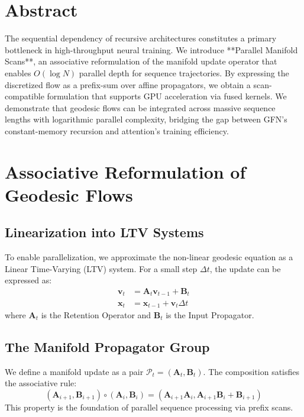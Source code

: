 \documentclass[11pt,a4paper]{report}
\begin{document}
\section{Abstract}
The sequential dependency of recursive architectures constitutes a primary bottleneck in high-throughput neural training. We introduce **Parallel Manifold Scans**, an associative reformulation of the manifold update operator that enables $O(\log N)$ parallel depth for sequence trajectories. By expressing the discretized flow as a prefix-sum over affine propagators, we obtain a scan-compatible formulation that supports GPU acceleration via fused kernels. We demonstrate that geodesic flows can be integrated across massive sequence lengths with logarithmic parallel complexity, bridging the gap between GFN's constant-memory recursion and attention's training efficiency.

\section{Associative Reformulation of Geodesic Flows}

\subsection{Linearization into LTV Systems}
To enable parallelization, we approximate the non-linear geodesic equation as a Linear Time-Varying (LTV) system. For a small step $\Delta t$, the update can be expressed as:
\begin{align}
    \mathbf{v}_t &= \mathbf{A}_t \mathbf{v}_{t-1} + \mathbf{B}_t \\
    \mathbf{x}_t &= \mathbf{x}_{t-1} + \mathbf{v}_t \Delta t
\end{align}
where $\mathbf{A}_t$ is the Retention Operator and $\mathbf{B}_t$ is the Input Propagator.

\subsection{The Manifold Propagator Group}
We define a manifold update as a pair $\mathcal{P}_t = (\mathbf{A}_t, \mathbf{B}_t)$. The composition satisfies the associative rule:
\begin{equation}
    (\mathbf{A}_{i+1}, \mathbf{B}_{i+1}) \circ (\mathbf{A}_i, \mathbf{B}_i) = (\mathbf{A}_{i+1} \mathbf{A}_i, \mathbf{A}_{i+1} \mathbf{B}_i + \mathbf{B}_{i+1})
\end{equation}
This property is the foundation of parallel sequence processing via prefix scans.
\end{document}
